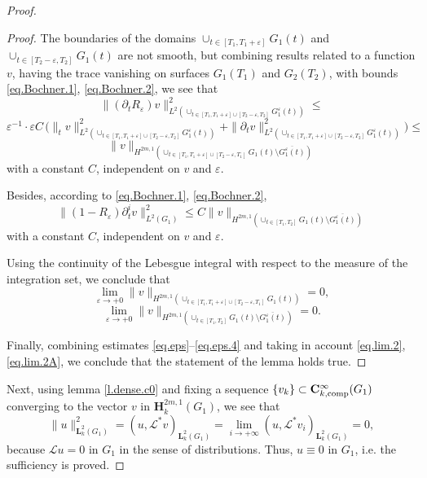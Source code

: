 \documentclass{amsart}
\theoremstyle{definition}
\theoremstyle{remark}
\numberwithin{equation}{section}
\begin{document}
\begin{proof}
\begin{proof}
The boundaries of the domains $\cup_{t \in [T_1,T_1+\varepsilon] } G_1 (t)$ and 
$\cup_{t \in [T_2-\varepsilon,T_2] } G_1 (t)$ are not smooth, but combining results 
\cite[ch. 3, \S 5]{MikhX} related to a function $v$, having the trace vanishing on surfaces  
$G_1(T_1)$ and $G_2 (T_2)$, with bounds  \eqref{eq.Bochner.1}, \eqref{eq.Bochner.2}, 
we see that 
\begin{equation} \label{eq.eps.3}
\| (\partial _t R_\varepsilon) v \|^2
_{L^{2} (\cup_{t\in [T_1,T_1+\varepsilon] \cup [T_2-\varepsilon ,T_2]}
G_1 ^{\varepsilon} (t) )}
\leq 
\end{equation}
$$
\varepsilon^{-1} \cdot \varepsilon 
C \, \Big( \| _t v\|^2
_{L^{2} (\cup_{t\in [T_1,T_1+\varepsilon] \cup [T_2-\varepsilon ,T_2]} 
G_1 ^{\varepsilon} (t) )} + 
\| \partial _t v\|^2
_{L^{2} (\cup_{t\in [T_1,T_1+\varepsilon] \cup [T_2-\varepsilon ,T_2]} 
G_1 ^{\varepsilon} (t) )} \Big)\leq 
$$
$$
\| v\|_{H^{2m,1} (\cup_{t\in [T_1,T_1+\varepsilon] \cup [T_2-\varepsilon,T_1]}  
G_1 (t) \setminus \overline{G_1^{\varepsilon} (t) })}
$$
with a constant $C$, independent on $v$ and  $\varepsilon$.

Besides, according to  \eqref{eq.Bochner.1}, \eqref{eq.Bochner.2}, 
\begin{equation} \label{eq.eps.4}
\|(1-R_\varepsilon)\partial^i_t v \|^2
_{L^{2} (G_1)}
\leq C \| v\|_{H^{2m,1} (\cup_{t\in [T_1,T_2]}  
G_1 (t) \setminus \overline{G_1^{\varepsilon} (t) })}
\end{equation}
with a constant $C$, independent on $v$ and  $\varepsilon$.

Using the continuity of the Lebesgue integral with respect 
to the measure of the integration set, we conclude that 
\begin{equation} \label{eq.lim.2}
\lim_{\varepsilon \to + 0}
\| v\|_{H^{2m,1} (\cup_{t\in [T_1,T_1+\varepsilon] \cup [T_2-\varepsilon,T_1]}  
G_1 (t) )} =0,
\end{equation}
\begin{equation} \label{eq.lim.2A}
\lim_{\varepsilon \to + 0}\| v\|_{H^{2m,1} (\cup_{t\in [T_1,T_2]}  
G_1 (t) \setminus \overline{G_1^{\varepsilon} (t) })} =0.
\end{equation}

Finally, combining estimates \eqref{eq.eps}--\eqref{eq.eps.4} and taking in account 
\eqref{eq.lim.2}, \eqref{eq.lim.2A}, 
we conclude that the statement of the lemma holds true. 
\end{proof}

Next, using lemma \ref{l.dense.c0} and fixing a sequence 
$\{ v_k \} \subset \mathbf{C}^\infty _{k, {\rm comp}} 
(G_1)$ converging to the vector 
$v$ in $\mathbf{H}^{2m,1}_k (G_1)$, we see that  
$$
\|u\|^2_{\mathbf{L}^2_k (G_1)} = 
(u , {\mathcal L}^* v )_{\mathbf{L}^2_k (G_1)} = 
\lim_{i \to + \infty }(u, {\mathcal L}^* v_ i )_{\mathbf{L}^2 _k(G_1)}   
= 0,
$$
because ${\mathcal L} u =0 $ in $G_1$ in the sense of distributions. 
Thus,  $u \equiv 0$ in $G_1$, i.e. the sufficiency is proved.


\end{proof}
\end{document}
